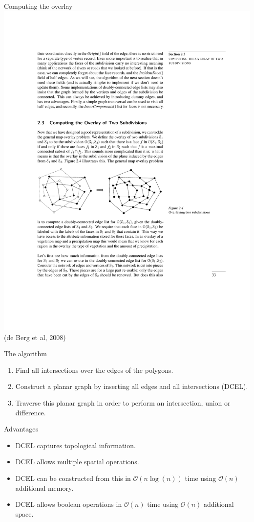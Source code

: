 \documentclass{beamer}
\begin{document}
\begin{frame}{Computing the overlay}
    \centering 
    \includegraphics[clip, trim=2cm 10cm 7.5cm 13.5cm,width=\linewidth]{figures/dcel04} 
    \flushright \tiny (de Berg et al, 2008)
\end{frame}

\begin{frame}{The algorithm}
    \begin{enumerate}
        \item Find all intersections over the edges of the polygons.
        \item Construct a planar graph by inserting all edges and all intersections (DCEL).
        \item Traverse this planar graph in order to perform an intersection, union or difference.
    \end{enumerate}
\end{frame}

\begin{frame}{Advantages}
    \begin{itemize}
        \item DCEL captures topological information.
        \item DCEL allows multiple spatial operations.
        \item DCEL can be constructed from this in $\mathcal{O}(n \log(n))$ time using $\mathcal{O}(n)$ additional memory.
        \item DCEL allows boolean operations in $\mathcal{O}(n)$ time using $\mathcal{O}(n)$ additional space.
    \end{itemize}
\end{frame}
\end{document}

